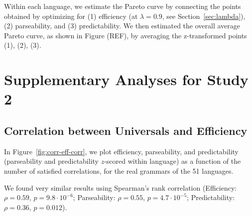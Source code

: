 \documentclass[10pt,twoside,lineno]{article}
\begin{document}
Within each language, we estimate the Pareto curve by connecting the points obtained by optimizing for (1) efficiency (at $\lambda = 0.9$, see Section~\ref{sec:lambda}), (2) parseability, and (3) predictability.
We then estimated the overall average Pareto curve, as shown in Figure (REF), by averaging the z-transformed points (1), (2), (3).


\section{Supplementary Analyses for Study 2}
\subsection{Correlation between Universals and Efficiency}

In Figure~\ref{fig:corr-eff-corr}, we plot efficiency, parseability, and predictability (parseability and predictability $z$-scored within language) as a function of the number of satisfied correlations, for the real grammars of the 51 languages.

We found very similar results using Spearman's rank correlation (Efficiency: $\rho=0.59$, $p = 9.8 \cdot 10^{-6}$; Parseability: $\rho=0.55$, $p=4.7 \cdot 10^{-5}$; Predictability: $\rho=0.36$, $p=0.012$).
\end{document}
